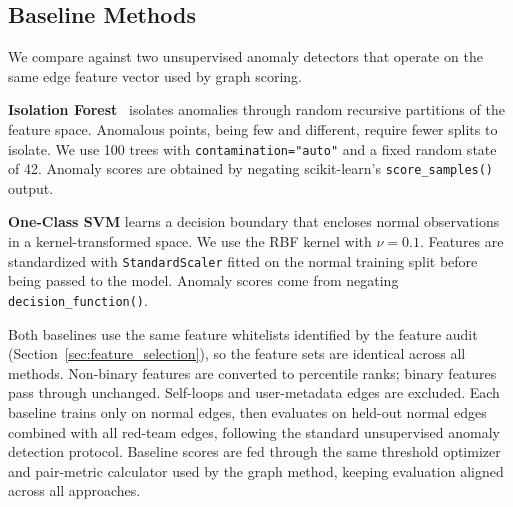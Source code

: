 
\subsection{Baseline Methods}
\label{sec:baseline_methods}

We compare against two unsupervised anomaly detectors that operate on the same edge feature vector used by graph scoring.

\textbf{Isolation Forest}~\cite{isoforest} isolates anomalies through random recursive partitions of the feature space. Anomalous points, being few and different, require fewer splits to isolate. We use 100 trees with \texttt{contamination="auto"} and a fixed random state of 42. Anomaly scores are obtained by negating scikit-learn's \texttt{score\_samples()} output.

\textbf{One-Class SVM} learns a decision boundary that encloses normal observations in a kernel-transformed space. We use the RBF kernel with $\nu = 0.1$. Features are standardized with \texttt{StandardScaler} fitted on the normal training split before being passed to the model. Anomaly scores come from negating \texttt{decision\_function()}.

Both baselines use the same feature whitelists identified by the feature audit (Section~\ref{sec:feature_selection}), so the feature sets are identical across all methods. Non-binary features are converted to percentile ranks; binary features pass through unchanged. Self-loops and user-metadata edges are excluded. Each baseline trains only on normal edges, then evaluates on held-out normal edges combined with all red-team edges, following the standard unsupervised anomaly detection protocol. Baseline scores are fed through the same threshold optimizer and pair-metric calculator used by the graph method, keeping evaluation aligned across all approaches.
